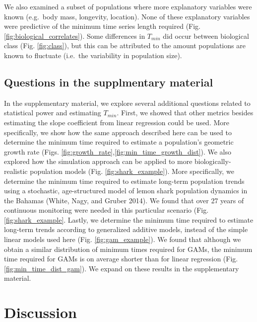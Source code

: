 \documentclass[12pt,]{article}
\begin{document}
We also examined a subset of populations where more explanatory
variables were known (e.g.~body mass, longevity, location). None of
these explanatory variables were predictive of the minimum time series
length required (Fig. \ref{fig:biological_correlates}). Some differences
in \(T_{min}\) did occur between biological class (Fig.
\ref{fig:class}), but this can be attributed to the amount populations
are known to fluctuate (i.e.~the variability in population size).

\subsection{Questions in the supplmentary
material}\label{questions-in-the-supplmentary-material}

In the supplementary material, we explore several additional questions
related to statistical power and estimating \(T_{min}\). First, we
showed that other metrics besides estimating the slope coefficient from
linear regression could be used. More specifically, we show how the same
approach described here can be used to determine the minimum time
required to estimate a population's geometric growth rate (Figs.
\ref{fig:growth_rate},\ref{fig:min_time_growth_dist}). We also explored
how the simulation approach can be applied to more
biologically-realistic population models (Fig. \ref{fig:shark_example}).
More specifically, we determine the minimum time required to estimate
long-term population trends using a stochastic, age-structured model of
lemon shark population dynamics in the Bahamas (White, Nagy, and Gruber
2014). We found that over 27 years of continuous monitoring were needed
in this particular scenario (Fig. \ref{fig:shark_example}. Lastly, we
determine the minimum time required to estimate long-term trends
according to generalized additive models, instead of the simple linear
models used here (Fig. \ref{fig:gam_example}). We found that although we
obtain a similar distribution of minimum times required for GAMs, the
minimum time required for GAMs is on average shorter than for linear
regression (Fig. \ref{fig:min_time_dist_gam}). We expand on these
results in the supplementary material.

\section{Discussion}\label{discussion}
\end{document}

